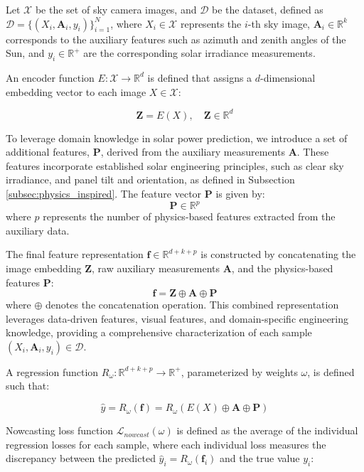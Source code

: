 Let \( \mathcal{X} \) be the set of sky camera images, and \( \mathcal{D} \) be the dataset, defined as \( \mathcal{D} = \{(X_i, \mathbf{A}_i, y_i)\}_{i=1}^N \), where \( X_i \in \mathcal{X} \) represents the \(i\)-th sky image, \( \mathbf{A}_i \in \mathbb{R}^k \) corresponds to the auxiliary features such as azimuth and zenith angles of the Sun, and \( y_i \in \mathbb{R}^+ \) are the corresponding solar irradiance measurements.

An encoder function \( E: \mathcal{X} \rightarrow \mathbb{R}^d \) is defined that assigns a \( d \)-dimensional embedding vector to each image \( X \in \mathcal{X} \):

\[
\mathbf{Z} = E(X), \quad \mathbf{Z} \in \mathbb{R}^d
\]


To leverage domain knowledge in solar power prediction, we introduce a set of additional features, \( \mathbf{P} \), derived from the auxiliary measurements \( \mathbf{A} \). These features incorporate established solar engineering principles, such as clear sky irradiance, and panel tilt and orientation, as defined in Subsection \ref{subsec:physics_inspired}. The feature vector \( \mathbf{P} \) is given by:
\[
\mathbf{P} \in \mathbb{R}^p
\]
where \( p \) represents the number of physics-based features extracted from the auxiliary data.

The final feature representation \( \mathbf{f} \in \mathbb{R}^{d+k+p} \) is constructed by concatenating the image embedding \( \mathbf{Z} \), raw auxiliary measurements \( \mathbf{A} \), and the physics-based features \( \mathbf{P} \):
\[
\mathbf{f} = \mathbf{Z} \oplus \mathbf{A} \oplus \mathbf{P}
\]
where \( \oplus \) denotes the concatenation operation. This combined representation leverages data-driven features, visual features, and domain-specific engineering knowledge, providing a comprehensive characterization of each sample \( (X_i, \mathbf{A}_i, y_i) \in \mathcal{D} \).

A regression function \( R_\omega: \mathbb{R}^{d+k+p} \rightarrow \mathbb{R}^+ \), parameterized by weights \( \omega \), is defined such that:

\[
\hat{y} = R_\omega(\mathbf{f}) = R_\omega(E(X) \oplus \mathbf{A} \oplus \mathbf{P})
\]


Nowcasting loss function \( \mathcal{L}_{nowcast}(\omega) \) is defined as the average of the individual regression losses for each sample, where each individual loss measures the discrepancy between the predicted \( \hat{y}_i = R_\omega(\mathbf{f}_i) \) and the true value \( y_i \):

